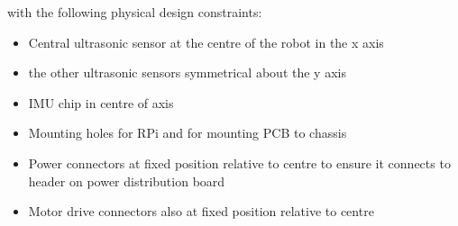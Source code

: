 with the following physical design constraints:

\begin{itemize}
  \item Central ultrasonic sensor at the centre of the robot in the x axis
  \item the other ultrasonic sensors symmetrical about the y axis
  \item IMU chip in centre of axis
  \item Mounting holes for RPi and for mounting PCB to chassis
  \item Power connectors at fixed position relative to centre to ensure it connects to header on power distribution board
  \item Motor drive connectors also at fixed position relative to centre
\end{itemize}

